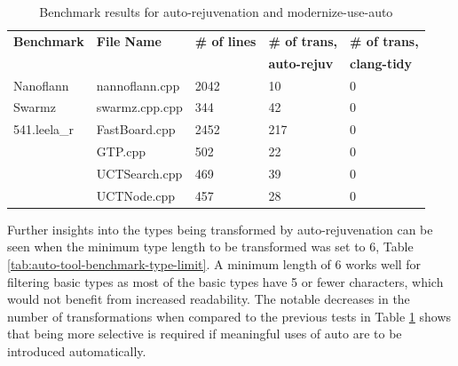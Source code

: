 \documentclass[bsc,frontabs,singlespacing,twoside,parskip,deptreport]{infthesis}
\begin{document}

\begin{table}[H]
    \begin{center}
        \begin{tabular}{| l | l | l | l | l |}
            \hline
            \textbf{Benchmark}    & \textbf{File Name}    & \textbf{\# of lines}  & \textbf{\# of trans,} & \textbf{\# of trans,} \\ 
                                  &                       &                       & \textbf{auto-rejuv}   & \textbf{clang-tidy}   \\ \hline
            Nanoflann    & nannoflann.cpp   & 2042  & 10  & 0\\ \hline
            Swarmz       & swarmz.cpp.cpp   & 344   & 42  & 0\\ \hline
            541.leela\_r & FastBoard.cpp    & 2452    & 217 & 0\\ \hline
                         & GTP.cpp          & 502    & 22  & 0\\ \hline
                         & UCTSearch.cpp    & 469   & 39  & 0\\ \hline
                         & UCTNode.cpp        & 457   & 28  & 0\\ \hline
        \end{tabular}
        \caption{Benchmark results for auto-rejuvenation and modernize-use-auto}
        \label{tab:auto-tool-benchmark-res}
    \end{center}
\end{table}

Further insights into the types being transformed by auto-rejuvenation can be seen when the minimum type length to be transformed was set to 6, Table \ref{tab:auto-tool-benchmark-type-limit}. A minimum length of 6 works well for filtering basic types as most of the basic types have 5 or fewer characters, which would not benefit from increased readability. The notable decreases in the number of transformations when compared to the previous tests in Table \ref{tab:auto-tool-benchmark-res} shows that being more selective is required if meaningful uses of auto are to be introduced automatically.

\end{document}
